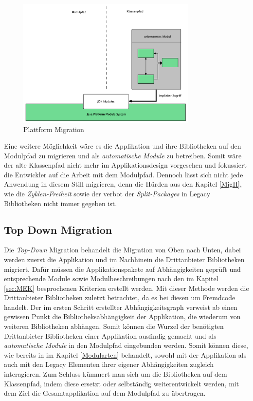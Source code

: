 	\begin{figure}[h]
		\centering
	    \includegraphics[width=0.8\textwidth]{material/images/plattform-migration.png}
	    \caption{Plattform Migration \cite{modulMitJava9}}
	    \label{fig:PM}
  	\end{figure}

	Eine weitere Möglichkeit wäre es die Applikation und ihre Bibliotheken auf den Modulpfad zu migrieren und als \textit{automatische Module} zu betreiben. Somit wäre der alte Klassenpfad  nicht mehr im Applikationsdesign vorgesehen und fokussiert die Entwickler auf die Arbeit mit dem Modulpfad. Dennoch lässt sich nicht jede Anwendung in diesem Still migrieren, denn die Hürden aus den Kapitel \ref{MigH}, wie die \textit{Zyklen-Freiheit} sowie der verbot der \textit{Split-Packages} in Legacy Bibliotheken nicht immer gegeben ist. 



\subsection{Top Down Migration}
	Die \textit{Top-Down} Migration behandelt die Migration von Oben nach Unten, dabei werden zuerst die Applikation und im Nachhinein die Drittanbieter Bibliotheken migriert. Dafür müssen die Applikationspakete auf Abhängigkeiten geprüft und entsprechende Module sowie Modulbeschreibungen nach den im Kapitel \ref{sec:MEK} besprochenen Kriterien erstellt werden. Mit dieser Methode werden die Drittanbieter Bibliotheken zuletzt betrachtet, da es bei diesen um Fremdcode handelt. \newline
	Der im ersten Schritt erstellter Abhängigkeitsgraph verweist ab einen gewissen Punkt die Bibliotheksabhängigkeit der Applikation, die wiederum von weiteren Bibliotheken abhängen. Somit können die Wurzel der benötigten Drittanbieter Bibliotheken einer Applikation ausfindig gemacht und als \textit{automatische Module} in den Modulpfad eingebunden werden. Somit können diese, wie bereits in im Kapitel \ref{Modularten} behandelt, sowohl mit der Applikation als auch mit den Legacy Elementen ihrer eigener Abhängigkeiten zugleich interagieren. Zum Schluss kümmert man sich um die Bibliotheken auf dem Klassenpfad, indem diese ersetzt oder selbständig weiterentwickelt werden, mit dem Ziel die Gesamtapplikation auf dem Modulpfad zu übertragen. \cite{javaMod9,modulProgJava9,java9modRevealed,modulMitJava9,masteringJava9}\bigbreak

